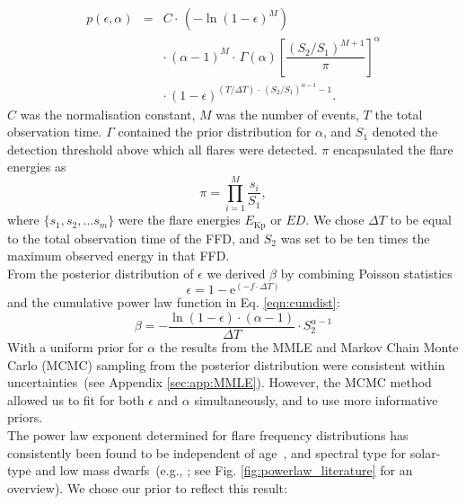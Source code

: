 \documentclass{aa}
\begin{document}
\begin{eqnarray}
\label{joint_posterior}
p(\epsilon, \alpha) &=& C \cdot\, (-\ln(1 - \epsilon)^{M})\nonumber\\
                    && \cdot\, (\alpha-1)^M \cdot\, \Gamma(\alpha) \left[\dfrac{(S_2 / S_1)^{M+1}}{\pi} \right]^{\alpha}\nonumber\\
                    && \cdot\, (1-\epsilon)^{(T / \Delta T) \,\cdot\, (S_2 /S_1)^{\alpha-1} -1 }.
\end{eqnarray}
$C$ was the normalisation constant, $M$ was the number of events, $T$ the total observation time. $\Gamma$ contained the prior distribution for $\alpha$, and $S_1$ denoted the detection threshold above which all flares were detected. $\pi$ encapsulated the flare energies as
\begin{equation}
    \pi = \displaystyle \prod_{i=1}^M \dfrac{s_i}{S_1},
\end{equation}
where $\{s_1,s_2,...s_m\}$ were the flare energies $E_\mathrm{Kp}$ or $ED$. We chose $\Delta T$ to be equal to the total observation time of the FFD, and $S_2$ was set to be ten times the maximum observed energy in that FFD.
\\
From the posterior distribution of $\epsilon$ we derived $\beta$ by combining Poisson statistics 
\begin{equation}
\epsilon = 1 - \mathrm{e}^{(-f\cdot\Delta T)}
\label{poissonstats}
\end{equation}
and the cumulative power law function in Eq. \ref{eqn:cumdist}:
\begin{equation}
\beta = - \dfrac{\ln(1 - \epsilon)\cdot (\alpha -1)}{\Delta T} \cdot S_2^{\alpha -1}
\label{eqn:epstobeta}
\end{equation}
With a uniform prior for $\alpha$ the results from the MMLE and Markov Chain Monte Carlo (MCMC) sampling from the posterior distribution were consistent within uncertainties~(see Appendix \ref{sec:app:MMLE}). However, the MCMC method allowed us to fit for both $\epsilon$ and $\alpha$ simultaneously, and to use more informative priors. 
\\
The power law exponent determined for flare frequency distributions has consistently been found to be independent of age~\citep{davenport2019}, and spectral type for solar-type and low mass dwarfs~(e.g., \citealt{chang2015, howard2019, lin2019}; see Fig. \ref{fig:powerlaw_literature} for an overview). We chose our prior to reflect this result: 
\end{document}
